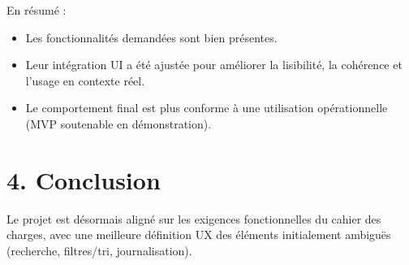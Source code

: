 \documentclass[12pt,a4paper]{article}
\begin{document}
En résumé :
\begin{itemize}[leftmargin=1.2cm]
  \item Les fonctionnalités demandées sont bien présentes.
  \item Leur intégration UI a été ajustée pour améliorer la lisibilité, la cohérence et l'usage en contexte réel.
  \item Le comportement final est plus conforme à une utilisation opérationnelle (MVP soutenable en démonstration).
\end{itemize}

\section*{4. Conclusion}
Le projet est désormais aligné sur les exigences fonctionnelles du cahier des charges, avec une meilleure définition UX des éléments initialement ambiguës (recherche, filtres/tri, journalisation).
\end{document}
